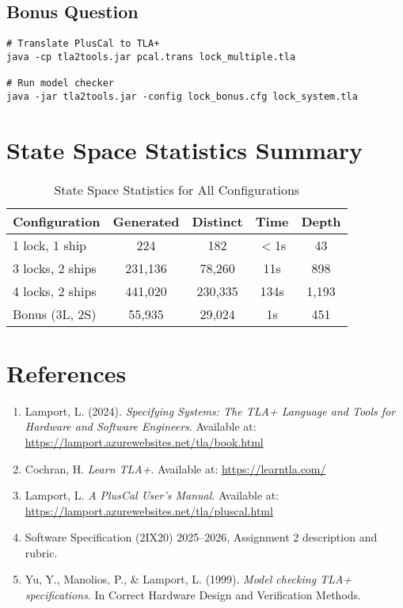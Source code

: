 \documentclass[12pt,a4paper]{article}
\begin{document}
\subsection{Bonus Question}
\begin{verbatim}
# Translate PlusCal to TLA+
java -cp tla2tools.jar pcal.trans lock_multiple.tla

# Run model checker
java -jar tla2tools.jar -config lock_bonus.cfg lock_system.tla
\end{verbatim}

\section{State Space Statistics Summary}

\begin{table}[h]
\centering
\begin{tabular}{lcccc}
\toprule
\textbf{Configuration} & \textbf{Generated} & \textbf{Distinct} & \textbf{Time} & \textbf{Depth} \\
\midrule
1 lock, 1 ship & 224 & 182 & $<$1s & 43 \\
3 locks, 2 ships & 231,136 & 78,260 & 11s & 898 \\
4 locks, 2 ships & 441,020 & 230,335 & 134s & 1,193 \\
Bonus (3L, 2S) & 55,935 & 29,024 & 1s & 451 \\
\bottomrule
\end{tabular}
\caption{State Space Statistics for All Configurations}
\end{table}

\section{References}

\begin{enumerate}
    \item Lamport, L. (2024). \textit{Specifying Systems: The TLA+ Language and Tools for Hardware and Software Engineers}. Available at: \url{https://lamport.azurewebsites.net/tla/book.html}
    
    \item Cochran, H. \textit{Learn TLA+}. Available at: \url{https://learntla.com/}
    
    \item Lamport, L. \textit{A PlusCal User's Manual}. Available at: \url{https://lamport.azurewebsites.net/tla/pluscal.html}
    
    \item Software Specification (2IX20) 2025--2026, Assignment 2 description and rubric.
    
    \item Yu, Y., Manolios, P., \& Lamport, L. (1999). \textit{Model checking TLA+ specifications}. In Correct Hardware Design and Verification Methods.
\end{enumerate}
\end{document}

